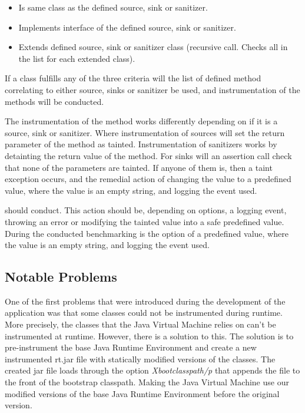 \hfill
\begin{itemize}
    \item Is same class as the defined source, sink or sanitizer.
    \item Implements interface of the defined source, sink or sanitizer.
    \item Extends defined source, sink or sanitizer class (recursive call. Checks all in the list for each extended class). 
\end{itemize}
\hfill

If a class fulfills any of the three criteria will the list of defined method correlating to either source, sinks or sanitizer be used, and instrumentation of the methods will be conducted.

The instrumentation of the method works differently depending on if it is a source, sink or sanitizer. Where instrumentation of sources will set the return parameter of the method as tainted. Instrumentation of sanitizers works by detainting the return value of the method. For sinks will an assertion call check that none of the parameters are tainted. If anyone of them is, then a taint exception occurs, and the remedial action of changing the value to a predefined value, where the value is an empty string, and logging the event used.

should conduct. This action should be, depending on options, a logging event, throwing an error or modifying the tainted value into a safe predefined value. During the conducted benchmarking is the option of a predefined value, where the value is an empty string, and logging the event used.



\subsection{Notable Problems}
\label{NotableProblems}
One of the first problems that were introduced during the development of the application was that some classes could not be instrumented during runtime. More precisely, the classes that the Java Virtual Machine relies on can't be instrumented at runtime. However, there is a solution to this. The solution is to pre-instrument the base Java Runtime Environment and create a new instrumented rt.jar file with statically modified versions of the classes. The created jar file loads through the option \textit{Xbootclasspath/p} that appends the file to the front of the bootstrap classpath. Making the Java Virtual Machine use our modified versions of the base Java Runtime Environment \parencite{xboot} before the original version.

